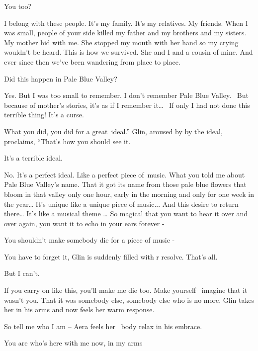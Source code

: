 \documentclass[letterpaper]{article}
\begin{document}
{\textquotedbl}You too?{\textquotedbl} 

{\textquotedbl}I belong with these people. It's my family. It's my relatives. My friends. When I was small, people of
your side killed my father and my brothers and my sisters. My mother hid with me. She stopped my mouth with her hand so
my crying wouldn't be heard. This is how we survived. She and I and a cousin of mine. And ever since then we've been
wandering from place to place.{\textquotedbl} 

{\textquotedbl}Did this happen in Pale Blue Valley?{\textquotedbl} 

{\textquotedbl}Yes. But I was too small to remember. I don't remember Pale Blue Valley. ~But because of mother's
stories, it's as if I remember it{\dots} \ If only I had not done this terrible thing! It's a curse.{\textquotedbl} 

{\textquotedbl}What you did, you did for a great~ideal.'' Glin, aroused by{ }by the ideal, proclaims,
``That's how you should see it.{\textquotedbl} 

{\textquotedbl}It's a terrible ideal.{\textquotedbl} 

{\textquotedbl}No. It's a perfect ideal. Like a perfect piece of~music. What you told me about Pale Blue Valley's name.
That it got its name from those pale blue flowers that bloom in that valley only one hour, early in the morning and
only for one week in the year{\dots} It's unique like a unique piece of music... And this desire to return there{\dots}
It's like a musical theme {\dots} So magical that you want to hear it over and over again, you want it to echo in your
ears forever -{\textquotedbl} 

{\textquotedbl}You shouldn't make somebody die for a piece of music -{\textquotedbl} 

{\textquotedbl}You have to forget it,{\textquotedbl} Glin is suddenly filled with r resolve. {\textquotedbl}That's
all.{\textquotedbl} 

{\textquotedbl}But I can't.{\textquotedbl} 

{\textquotedbl}If you carry on like this, you'll make me die too. Make{ }yourself{
\ }imagine that it wasn't you. That it was somebody else, somebody else who is no more.{\textquotedbl} Glin takes her
in his arms and now feels her warm response. 

{\textquotedbl}So tell me who I am -- {\textquotedbl} Aera feels her \ body relax in his embrace.

{\textquotedbl}You are who's here with me now, in my arms{\textquotedbl} 
\end{document}
